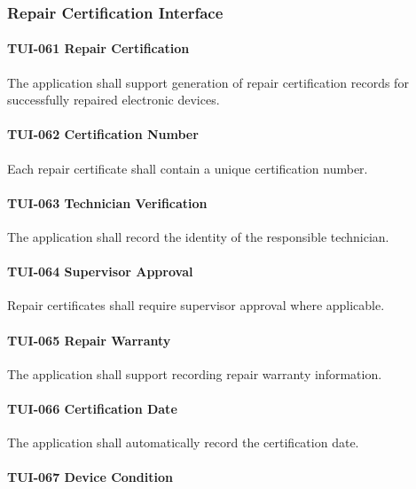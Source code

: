 \subsubsection*{Repair Certification Interface}

\paragraph{TUI-061 Repair Certification}

The application shall support generation of repair certification records
for successfully repaired electronic devices.

\paragraph{TUI-062 Certification Number}

Each repair certificate shall contain a unique certification number.

\paragraph{TUI-063 Technician Verification}

The application shall record the identity of the responsible technician.

\paragraph{TUI-064 Supervisor Approval}

Repair certificates shall require supervisor approval where applicable.

\paragraph{TUI-065 Repair Warranty}

The application shall support recording repair warranty information.

\paragraph{TUI-066 Certification Date}

The application shall automatically record the certification date.

\paragraph{TUI-067 Device Condition}

